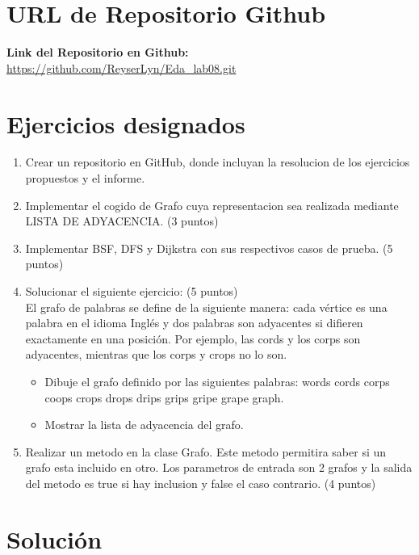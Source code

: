 \documentclass{article}
\begin{document}
    \section{URL de Repositorio Github}
        \textbf{Link del Repositorio en Github: }    
            \url{https://github.com/ReyserLyn/Eda_lab08.git}

	
    \section{Ejercicios designados}

    \begin{enumerate}
        \item Crear un repositorio en GitHub, donde incluyan la resolucion de los ejercicios propuestos y el informe. 
        \item Implementar el cogido de Grafo cuya representacion sea realizada mediante LISTA DE ADYACENCIA. (3 puntos) 
        \item Implementar BSF, DFS y Dijkstra con sus respectivos casos de prueba. (5 puntos)
        \item Solucionar el siguiente ejercicio: (5 puntos) \\
        El grafo de palabras se define de la siguiente manera: cada vértice es una palabra en el idioma Inglés y dos palabras son adyacentes si difieren exactamente en una posición. Por ejemplo, las cords y los corps son adyacentes, mientras que los corps y crops no lo son. 
        
        {\begin{itemize}
            \item Dibuje el grafo definido por las siguientes palabras: words cords corps coops crops drops drips grips gripe grape graph.
            \item Mostrar la lista de adyacencia del grafo.
        \end{itemize}}

        \item Realizar un metodo en la clase Grafo. Este metodo permitira saber si un grafo esta incluido en otro. Los parametros de entrada son 2 grafos y la salida del metodo es true si hay inclusion y false el caso contrario. (4 puntos)
    \end{enumerate} 

    \section{Solución}
    
\end{document}
